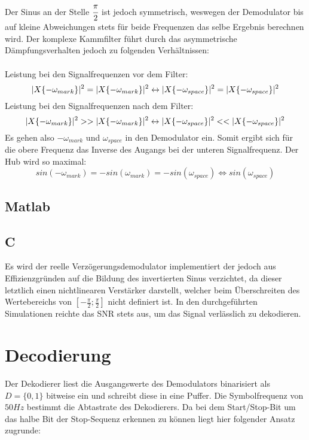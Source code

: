 \documentclass{article}
\begin{document}
Der Sinus an der Stelle $\cfrac{\pi}{2}$ ist jedoch symmetrisch, weswegen der Demodulator bis auf kleine Abweichungen stets für beide Frequenzen das selbe Ergebnis berechnen wird. Der komplexe Kammfilter führt durch das asymmetrische Dämpfungsverhalten jedoch zu folgenden Verhältnissen:\\\\
Leistung bei den Signalfrequenzen vor dem Filter:
$$
\arrowvert X \{ -\omega_{mark} \} \arrowvert^2 = \arrowvert X \{ -\omega_{mark} \} \arrowvert^2 \leftrightarrow \arrowvert X \{ -\omega_{space} \} \arrowvert^2 = \arrowvert X \{ -\omega_{space} \} \arrowvert^2
$$
Leistung bei den Signalfrequenzen nach dem Filter:
$$
\arrowvert X \{ -\omega_{mark} \} \arrowvert^2 >> \arrowvert X \{ -\omega_{mark} \} \arrowvert^2 \leftrightarrow \arrowvert X \{ -\omega_{space} \} \arrowvert^2 << \arrowvert X \{ -\omega_{space} \} \arrowvert^2
$$
Es gehen also $-\omega_{mark}$ und $\omega_{space}$ in den Demodulator ein.
Somit ergibt sich für die obere Frequenz das Inverse des Augangs bei der unteren Signalfrequenz. Der Hub wird so maximal:
$$
sin(-\omega_{mark}) = -sin(\omega_{mark}) = -sin(\omega_{space}) \Longleftrightarrow sin(\omega_{space})
$$
\subsection{Matlab}

\subsection{C}
Es wird der reelle Verzögerungsdemodulator implementiert der jedoch aus Effizienzgründen auf die Bildung des invertierten Sinus verzichtet, da dieser letztlich einen nichtlinearen Verstärker darstellt, welcher beim Überschreiten des Wertebereichs von $[-\frac{\pi}{2};\frac{\pi}{2}]$ nicht definiert ist. In den durchgeführten Simulationen reichte das SNR stets aus, um das Signal verlässlich zu dekodieren.
\section{Decodierung}

Der Dekodierer liest die Ausgangswerte des Demodulators binarisiert als $D = \{0,1\}$ bitweise ein und schreibt diese in eine Puffer. 
Die Symbolfrequenz von $50Hz$ bestimmt die Abtastrate des Dekodierers. Da bei dem Start/Stop-Bit um das
halbe Bit der Stop-Sequenz erkennen zu können liegt hier folgender Ansatz zugrunde:
\end{document}
